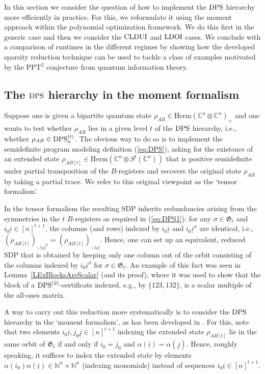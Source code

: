 \documentclass[11pt]{article}
\newcommand{\N}{\ensuremath{\mathbb{N}}}   %
\newcommand{\C}{\ensuremath{\mathbb{C}}} %
\newcommand{\Perm}{\mathfrak G}
\newcommand{\Herm}{\mathrm{Herm}}
\newcommand{\CLDUI}{\text{\rm CLDUI}}
\newcommand{\LDOI}{\text{\rm LDOI}}
\newcommand{\DPS}{\text{\rm DPS}}
\newcommand{\ot}{\otimes}
\newcommand{\ui}{\underline{i}}
\newcommand{\uj}{\underline{j}}
\theoremstyle{plain}
\begin{document}
In this section we consider the question of how to implement the $\DPS$ hierarchy more efficiently in practice. %
For this, we reformulate it using the moment approach within the polynomial optimization framework. We do this first in the generic case and then we consider the $\CLDUI$ and $\LDOI$ cases. We conclude with a  comparison of runtimes in the different regimes by showing how the developed sparsity reduction technique can be used to tackle a class of examples motivated by the   PPT$^2$ conjecture from quantum information theory.

\subsection{The $\DPS$ hierarchy in the moment formalism}

Suppose one is given a bipartite quantum state $\rho_{AB}\in\Herm(\C^n\ot\C^n)_+$ and one wants to test whether $\rho_{AB}$ lies in a given level $t$ of the $\DPS$ hierarchy, i.e., whether $\rho_{AB}\in\DPS^{(t)}_n$. 
The obvious way to do so is to implement the semidefinite program modeling definition (\ref{eq:DPS}), asking for the existence of an extended state $\rho_{AB[t]}\in\Herm(\C^n\ot S^t(\C^n))$ that is positive semidefinite under   partial transposition of the $B$-registers and recovers the original state $\rho_{AB}$ by taking a partial trace. We refer to this original viewpoint as the `tensor formalism'.

In the tensor formalism the resulting SDP inherits redundancies arising from the symmetries in the $t$ $B$-registers as required in (\ref{eq:DPS1}): for any $\sigma \in \Perm_t$ and $i_0\ui\in[n]^{t+1}$,  the   columns (and rows) indexed by $i_0\ui$ and $i_0  \ui^\sigma$ are identical, i.e., $(\rho_{AB[t]})_{\cdot, i_0 \ui^\sigma} = (\rho_{AB[t]})_{\cdot, i_0\ui}$. Hence, one can set up an equivalent, reduced SDP that is obtained by keeping only one column out of the orbit consisting of the  columns indexed by $i_0\ui^\sigma$ for     $\sigma\in\Perm_t$.
An example of this fact was seen in Lemma~\ref{LExBlocksAreScalar} (and its proof), where it was used to show that the block of a $\DPS^{(2)}$-certificate  indexed, e.g.,  by $\{123,132\}$,    is   a scalar multiple of the all-ones matrix.

\medskip
A way to carry out this reduction more systematically is to consider the $\DPS$ hierarchy in the `moment formalism', as has been developed in \cite{GLS_2021}. For this, note that two elements $i_0\ui,j_0\uj\in [n]^{t+1}$ indexing the extended state $\rho_{AB[t]}$  lie in the same orbit of $\Perm_t$ if and only if $i_0=j_0$ and $\alpha(\ui) = \alpha(\uj)$. Hence, roughly speaking, it suffices to index the extended state by elements $\alpha(i_0)\alpha(\ui)\in \N^n\times \N^n$ (indexing monomials)   instead of sequences $i_0\ui\in [n]^{t+1}$. %
\end{document}
